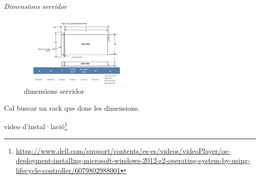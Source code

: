 \documentclass[
  10pt,
]{krantz}
\DeclareRobustCommand{\href}[2]{#2\footnote{\url{#1}}}
\begin{document}
\emph{Dimensions servidor}

\begin{figure}
\centering
\includegraphics[width=0.5\textwidth,height=\textheight]{imatges/dimserver.png}
\caption{dimensions servidor}
\end{figure}

Cal buscar un rack que done les dimensions.

\href{https://www.dell.com/support/contents/es-es/videos/videoPlayer/os-deployment-installing-microsoft-windows-2012-r2-operating-system-by-using-lifecycle-controller/6079802988001}{video d'instal·lació}
\end{document}
